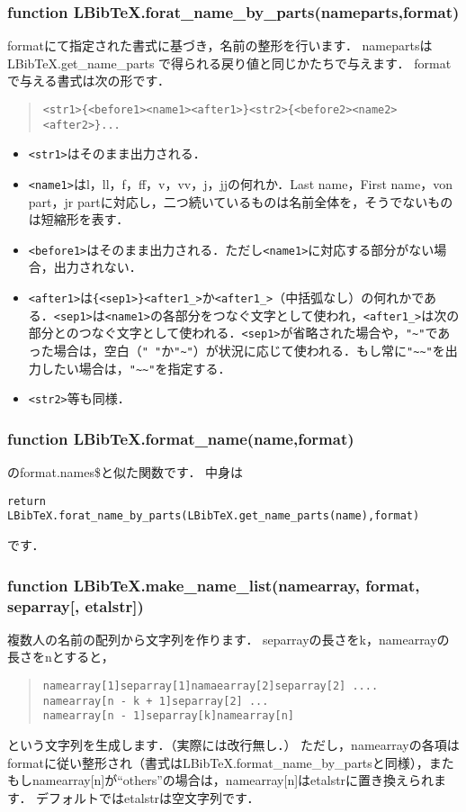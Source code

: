 \documentclass[dvipdfmx,a4paper]{jsarticle}
\begin{document}
\subsubsection{function LBibTeX.forat\_name\_by\_parts(nameparts,format)}
formatにて指定された書式に基づき，名前の整形を行います．
namepartsはLBibTeX.get\_name\_parts で得られる戻り値と同じかたちで与えます．
formatで与える書式は次の形です．
\begin{quote}
\begin{verbatim}
<str1>{<before1><name1><after1>}<str2>{<before2><name2><after2>}...
\end{verbatim}
\end{quote}
\begin{itemize}
\item \verb|<str1>|はそのまま出力される．
\item \verb|<name1>|はl，ll，f，ff，v，vv，j，jjの何れか．Last name，First name，von part，jr partに対応し，二つ続いているものは名前全体を，そうでないものは短縮形を表す．
\item \verb|<before1>|はそのまま出力される．ただし\verb|<name1>|に対応する部分がない場合，出力されない．
\item \verb|<after1>|は\verb|{<sep1>}<after1_>|か\verb|<after1_>|（中括弧なし）の何れかである．\verb|<sep1>|は\verb|<name1>|の各部分をつなぐ文字として使われ，\verb|<after1_>|は次の部分とのつなぐ文字として使われる．\verb|<sep1>|が省略された場合や，\verb|"~"|であった場合は，空白（\verb|" "|か\verb|"~"|）が状況に応じて使われる．もし常に\verb|"~~"|を出力したい場合は，\verb|"~~"|を指定する．
\item \verb|<str2>|等も同様．
\end{itemize}

\subsubsection{function LBibTeX.format\_name(name,format)}
\BibTeX のformat.names\$と似た関数です．
中身は
\begin{lstlisting}
return LBibTeX.forat_name_by_parts(LBibTeX.get_name_parts(name),format)
\end{lstlisting}
です．

\subsubsection{function LBibTeX.make\_name\_list(namearray, format, separray[, etalstr])}
複数人の名前の配列から文字列を作ります．
separrayの長さをk，namearrayの長さをnとすると，
\begin{quote}
\begin{verbatim}
namearray[1]separray[1]namaearray[2]separray[2] .... 
namearray[n - k + 1]separray[2] ...
namearray[n - 1]separray[k]namearray[n]
\end{verbatim}
\end{quote}
という文字列を生成します．（実際には改行無し．）
ただし，namearrayの各項はformatに従い整形され（書式はLBibTeX.format\_name\_by\_partsと同様），またもしnamearray[n]が``others''の場合は，namearray[n]はetalstrに置き換えられます．
デフォルトではetalstrは空文字列です．
\end{document}
